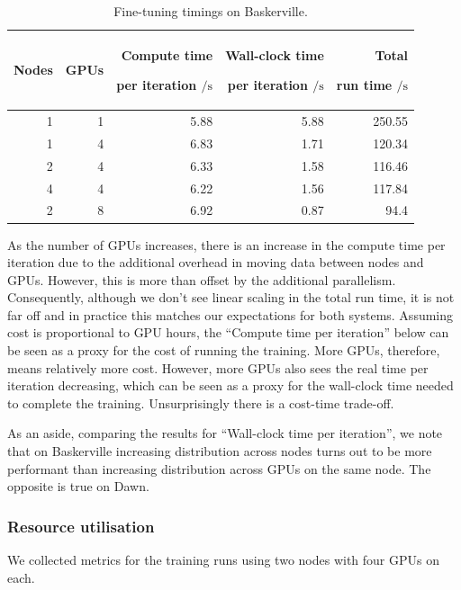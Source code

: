 \begin{table}[t] %
    \centering
    \begin{tabular}{@{}rrrrr@{}}
      \toprule
      Nodes
      & GPUs
      & \shortstack[r]{Compute time\strut \\ per iteration ${}/\unit{\second}$}
      & \shortstack[r]{Wall-clock time\strut \\ per iteration ${}/\unit{\second}$}
      & \shortstack[r]{Total\strut \\ run time ${}/\unit{\second}$} \\ \midrule
        1 & 1 & 5.88& 5.88& 250.55\\
        1 & 4 & 6.83& 1.71& 120.34\\
        2 & 4 & 6.33& 1.58& 116.46\\
        4 & 4 & 6.22& 1.56& 117.84\\
        2 & 8 & 6.92& 0.87& 94.4\\ \bottomrule
    \end{tabular}
    \caption{Fine-tuning timings on Baskerville.}
    \label{tab:fine-tune-bask}
\end{table}

As the number of GPUs increases, there is an increase in the compute time per iteration due to the additional overhead in moving data between nodes and GPUs. However, this is more than offset by the additional parallelism. Consequently, although we don't see linear scaling in the total run time, it is not far off and in practice this matches our expectations for both systems. Assuming cost is proportional to GPU hours, the ``Compute time per iteration'' below can be seen as a proxy for the cost of running the training. More GPUs, therefore, means relatively more cost. However, more GPUs also sees the real time per iteration decreasing, which can be seen as a proxy for the wall-clock time needed to complete the training. Unsurprisingly there is a cost-time trade-off.

As an aside, comparing the results for ``Wall-clock time per iteration'', we note that on Baskerville increasing distribution across nodes turns out to be more performant than increasing distribution across GPUs on the same node. The opposite is true on Dawn.

\subsubsection{Resource utilisation}

We collected metrics for the training runs using two nodes with four GPUs on each.

